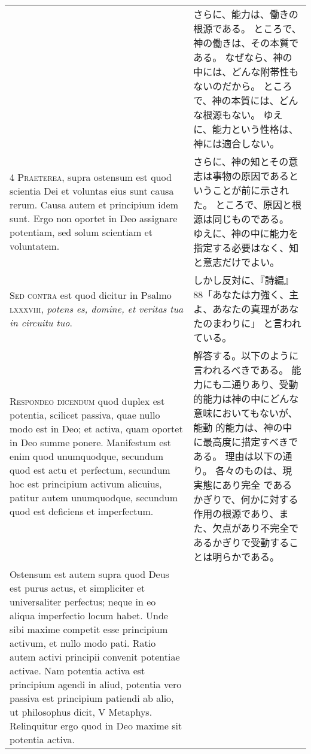 \documentclass[10pt]{jsarticle} %
\begin{document}
\begin{longtable}{p{21em}p{21em}}
&

さらに、能力は、働きの根源である。
ところで、神の働きは、その本質である。
なぜなら、神の中には、どんな附帯性もないのだから。
ところで、神の本質には、どんな根源もない。
ゆえに、能力という性格は、神には適合しない。

\\


{\scshape 4 Praeterea}, supra ostensum est quod scientia
Dei et voluntas eius sunt causa rerum. Causa autem et principium idem
sunt. Ergo non oportet in Deo assignare potentiam, sed solum scientiam
et voluntatem.

&

さらに、神の知とその意志は事物の原因であるということが前に示された。
ところで、原因と根源は同じものである。
ゆえに、神の中に能力を指定する必要はなく、知と意志だけでよい。

\\


{\scshape Sed contra} est quod dicitur in Psalmo
{\scshape lxxxviii}, {\itshape potens es, domine, et veritas tua in circuitu tuo}.

&

しかし反対に、『詩編』88「あなたは力強く、主よ、あなたの真理があなたのまわりに」
と言われている。

\\


{\scshape Respondeo dicendum} quod duplex est potentia,
scilicet passiva, quae nullo modo est in Deo; et activa, quam oportet in
Deo summe ponere. Manifestum est enim quod unumquodque, secundum quod
est actu et perfectum, secundum hoc est principium activum alicuius,
patitur autem unumquodque, secundum quod est deficiens et
imperfectum. 


&

解答する。以下のように言われるべきである。
能力にも二通りあり、受動的能力は神の中にどんな意味においてもないが、能動
 的能力は、神の中に最高度に措定すべきである。
理由は以下の通り。
各々のものは、現実態にあり完全
 であるかぎりで、何かに対する作用の根源であり、また、欠点があり不完全であるかぎりで受動することは明らかである。


\\

Ostensum est autem supra quod Deus est purus actus, et
simpliciter et universaliter perfectus; neque in eo aliqua imperfectio
locum habet. Unde sibi maxime competit esse principium activum, et nullo
modo pati. Ratio autem activi principii convenit potentiae activae. Nam
potentia activa est principium agendi in aliud, potentia vero passiva
est principium patiendi ab alio, ut philosophus dicit, V
Metaphys. Relinquitur ergo quod in Deo maxime sit potentia activa.


\end{longtable}
\end{document}

